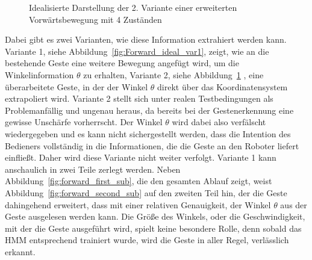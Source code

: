 \begin{figure}[htb]
\centering
{}
\caption[Idealisierte Darstellung der 2. Variante einer erweiterten Vorw\"artsbewegung mit 4 Zust\"anden]{Idealisierte Darstellung der 2. Variante einer erweiterten Vorw\"artsbewegung mit 4 Zust\"anden}
\label{fig:Forward_ideal_var2}
\end{figure}

Dabei gibt es zwei Varianten, wie diese Information extrahiert werden kann. Variante 1, siehe Abbildung~\ref{fig:Forward_ideal_var1}, zeigt, wie an die bestehende Geste eine weitere Bewegung angef\"ugt wird, um die Winkelinformation $\theta$ zu erhalten, Variante 2, siehe Abbildung~\ref{fig:Forward_ideal_var2} , eine \"uberarbeitete Geste, in der der Winkel $\theta$ direkt \"uber das Koordinatensystem extrapoliert wird.
\newline
Variante 2 stellt sich unter realen Testbedingungen als Problemanf\"allig und ungenau heraus, da bereits bei der Gestenerkennung eine gewisse Unsch\"arfe vorherrscht. Der Winkel $\theta$ wird dabei also verf\"alscht wiedergegeben und es kann nicht sichergestellt werden, dass die Intention des Bedieners vollst\"andig in die Informationen, die die Geste an den Roboter liefert einflie\ss t. Daher wird diese Variante nicht weiter verfolgt.
\newline
Variante 1 kann anschaulich in zwei Teile zerlegt werden. Neben Abbildung~\ref{fig:forward_first_sub}, die den gesamten Ablauf zeigt, weist Abbildung~\ref{fig:forward_second_sub} auf den zweiten Teil hin, der die Geste dahingehend erweitert, dass mit einer relativen Genauigkeit, der Winkel $\theta$ aus der Geste ausgelesen werden kann. Die Gr\"o\ss e des Winkels, oder die Geschwindigkeit, mit der die Geste ausgef\"uhrt wird, spielt keine besondere Rolle, denn sobald das \acrshort{HMM} entsprechend trainiert wurde, wird die Geste in aller Regel, verl\"asslich erkannt.

